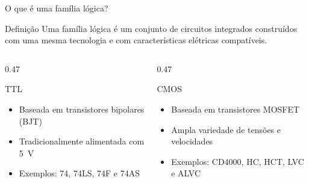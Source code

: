 
\begin{frame}{O que é uma família lógica?}
    \begin{block}{Definição}
        Uma família lógica é um conjunto de circuitos integrados construídos
        com uma mesma tecnologia e com características elétricas compatíveis.
    \end{block}

    \begin{columns}[T]
        \begin{column}{0.47\textwidth}
            \begin{alertblock}{TTL}
                \begin{itemize}
                    \item Baseada em transistores bipolares (BJT)
                    \item Tradicionalmente alimentada com 5~V
                    \item Exemplos: 74, 74LS, 74F e 74AS
                \end{itemize}
            \end{alertblock}
        \end{column}
        \begin{column}{0.47\textwidth}
            \begin{block}{CMOS}
                \begin{itemize}
                    \item Baseada em transistores MOSFET
                    \item Ampla variedade de tensões e velocidades
                    \item Exemplos: CD4000, HC, HCT, LVC e ALVC
                \end{itemize}
            \end{block}
        \end{column}
    \end{columns}
\end{frame}